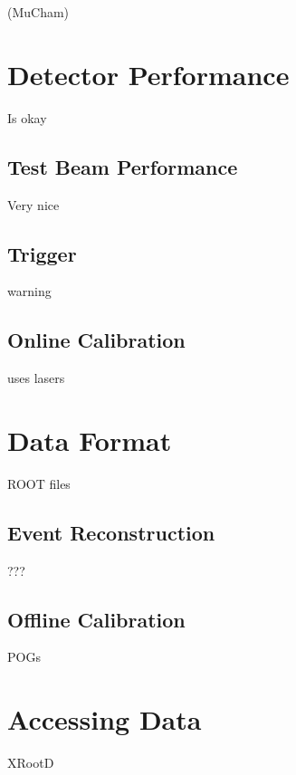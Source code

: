 (MuCham)

\section{Detector Performance}

Is okay

\subsection{Test Beam Performance}

Very nice

\subsection{Trigger}

warning

\subsection{Online Calibration}

uses lasers

\section{Data Format}

ROOT files

\subsection{Event Reconstruction} \label{sec:event-reco}

???

\subsection{Offline Calibration}

POGs

\section{Accessing Data}

XRootD

